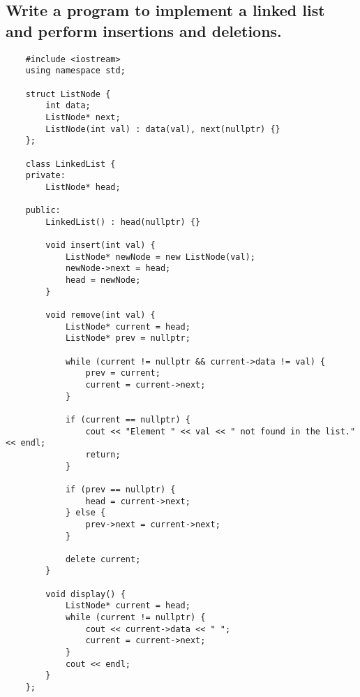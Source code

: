 \subsection{Write a program to implement a linked list and perform insertions and deletions.}
\begin{tcolorbox}[title=]
\begin{verbatim}
    #include <iostream>
    using namespace std;
    
    struct ListNode {
        int data;
        ListNode* next;
        ListNode(int val) : data(val), next(nullptr) {}
    };
    
    class LinkedList {
    private:
        ListNode* head;
    
    public:
        LinkedList() : head(nullptr) {}
    
        void insert(int val) {
            ListNode* newNode = new ListNode(val);
            newNode->next = head;
            head = newNode;
        }
    
        void remove(int val) {
            ListNode* current = head;
            ListNode* prev = nullptr;
    
            while (current != nullptr && current->data != val) {
                prev = current;
                current = current->next;
            }
    
            if (current == nullptr) {
                cout << "Element " << val << " not found in the list." << endl;
                return;
            }
    
            if (prev == nullptr) {
                head = current->next;
            } else {
                prev->next = current->next;
            }
    
            delete current;
        }
    
        void display() {
            ListNode* current = head;
            while (current != nullptr) {
                cout << current->data << " ";
                current = current->next;
            }
            cout << endl;
        }
    };
\end{verbatim}
\end{tcolorbox}

